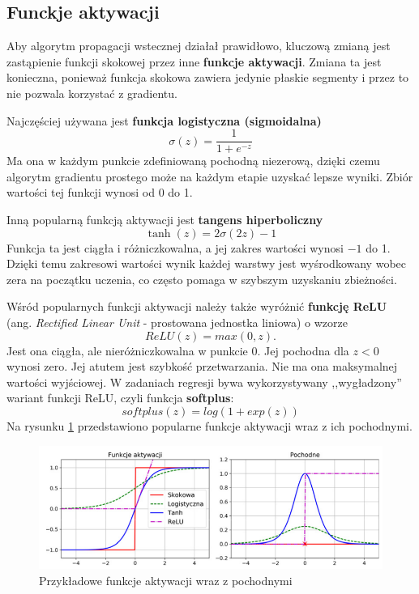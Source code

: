 \documentclass[12pt]{mwbk}
\theoremstyle{plain}
\theoremstyle{definition}
\theoremstyle{remark}
\newcommand\zrodlo[1]{\par\vspace{-3mm}{\small\textit{Źródło: }#1 }}
\begin{document}
\subsection{Funckje aktywacji}

Aby algorytm propagacji wstecznej działał prawidłowo, kluczową zmianą jest zastąpienie funkcji skokowej przez inne \textbf{funkcje aktywacji}. Zmiana ta jest konieczna, ponieważ funkcja skokowa zawiera jedynie płaskie segmenty i przez to nie pozwala korzystać z gradientu. 

Najczęściej używana jest \textbf{funkcja logistyczna (sigmoidalna)}
$$\sigma(z)=\frac{1}{1+e^{-z}}$$
Ma ona w każdym punkcie zdefiniowaną pochodną niezerową, dzięki czemu algorytm gradientu prostego może na każdym etapie uzyskać lepsze wyniki. Zbiór wartości tej funkcji wynosi od 0 do 1.

Inną popularną funkcją aktywacji jest \textbf{tangens hiperboliczny}
$$\operatorname{tanh}(z)=2\sigma(2z)-1$$
Funkcja ta jest ciągła i różniczkowalna, a jej zakres wartości wynosi $-1$ do 1. Dzięki temu zakresowi wartości wynik każdej warstwy jest wyśrodkowany wobec zera na początku uczenia, co często pomaga w szybszym uzyskaniu zbieżności.

Wśród popularnych funkcji aktywacji należy także wyróżnić  \textbf{funkcję ReLU} (ang. \emph{Rectified Linear Unit} - prostowana jednostka liniowa) o wzorze
$$ReLU(z)=max(0,z).$$
Jest ona ciągła, ale nieróżniczkowalna w punkcie 0. Jej pochodna dla $z<0$ wynosi zero. Jej atutem jest szybkość przetwarzania. Nie ma ona maksymalnej wartości wyjściowej.
W zadaniach regresji bywa wykorzystywany ,,wygładzony'' wariant funkcji ReLU, czyli funkcja \textbf{softplus}:
$$softplus(z)=log(1+exp(z))$$
Na  rysunku \ref{fig:funkcje-aktywacji} przedstawiono popularne funkcje aktywacji wraz z ich pochodnymi.

\begin{figure}[!h]
	\centering
	\includegraphics[width=\linewidth]{rys/funkcje_aktywacji.png}
	\caption{Przykładowe funkcje aktywacji wraz z pochodnymi}
	\zrodlo{\cite{geron}}
	\label{fig:funkcje-aktywacji}
\end{figure}
\end{document}
